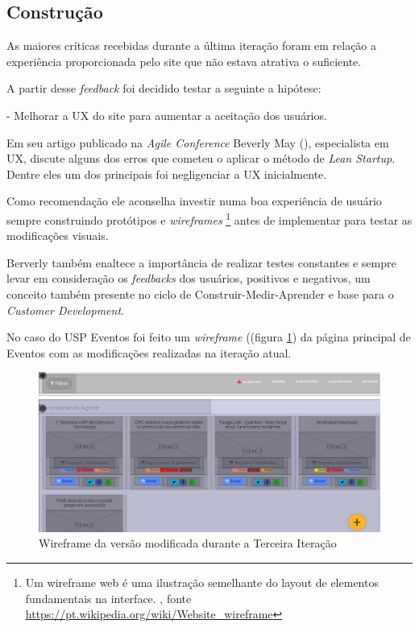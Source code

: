 \subsection{Construção}
	\par As maiores críticas recebidas durante a última iteração foram em relação a experiência proporcionada pelo site que não estava atrativa o suficiente.
	\par A partir desse \emph{feedback} foi decidido testar a seguinte a hipótese:
	\par - Melhorar a UX do site para aumentar a aceitação dos usuários.
	\par Em seu artigo publicado na \emph{Agile Conference} Beverly May (\cite{beverly:2012}), especialista em UX, discute alguns dos erros que cometeu o aplicar o método de \emph{Lean Startup}. Dentre eles um dos principais foi negligenciar a UX inicialmente.
	\par Como recomendação ele aconselha investir numa boa experiência de usuário sempre construindo protótipos e \emph{wireframes} \footnote{ Um wireframe web é uma ilustração semelhante do layout de elementos fundamentais na interface. , fonte \url{https://pt.wikipedia.org/wiki/Website_wireframe}} antes de implementar para testar as modificações visuais.
	 \par Berverly também enaltece a importância de realizar testes constantes e sempre levar em consideração os \emph{feedbacks} dos usuários, positivos e negativos, um conceito também presente no ciclo de Construir-Medir-Aprender e base para o \emph{Customer Development}.
	\par No caso do USP Eventos foi feito um \emph{wireframe} ((figura \ref{fig:wireframe}) da página principal de Eventos com as modificações realizadas na iteração atual.
\begin{figure}[htb]
\centering
\includegraphics[width=15cm]{figuras/wireframe}
\caption{\label{fig:wireframe} Wireframe da versão modificada durante a Terceira Iteração}
\end{figure}
